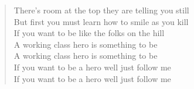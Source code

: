 \documentclass[a4paper,oneside,onecolumn]{article}
\begin{document}
\begin{verse}
There's room at the top they are telling you still\\
But first you must learn how to smile as you kill\\
If you want to be like the folks on the hill\\
A working class hero is something to be\\
A working class hero is something to be\\
If you want to be a hero well just follow me\\
If you want to be a hero well just follow me\\
\end{verse}
\end{document}

